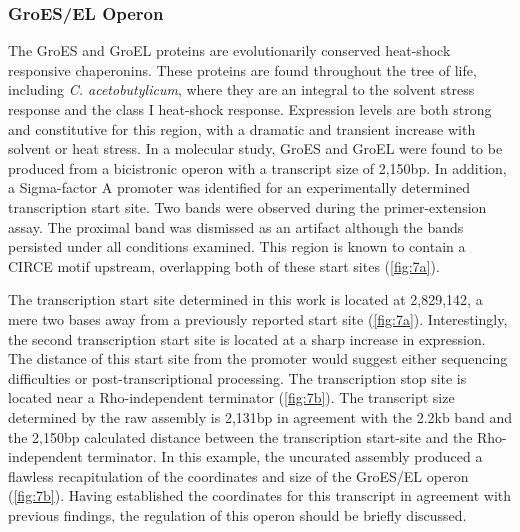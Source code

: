 \subsubsection{GroES/EL Operon}
The GroES and GroEL proteins are evolutionarily conserved heat-shock responsive chaperonins. These proteins are found throughout the tree of life, including \textit{C. acetobutylicum}, where they are an integral to the solvent stress response\cite{74,75,76} and the class I heat-shock response\cite{42,74,75}. Expression levels are both strong and constitutive for this region, with a dramatic and transient increase with solvent or heat stress\cite{74,75}. In a molecular study, GroES and GroEL were found to be produced from a bicistronic operon with a transcript size of 2,150bp\cite{76}. In addition, a Sigma-factor A promoter was identified for an experimentally determined transcription start site. Two bands were observed during the primer-extension assay\cite{76}. The proximal band was dismissed as an artifact although the bands persisted under all conditions examined\cite{76}. This region is known to contain a CIRCE motif upstream\cite{77}, overlapping both of these start sites (\ref{fig:7a})\cite{75}. 

The transcription start site determined in this work is located at 2,829,142, a mere two bases away from a previously reported start site\cite{76} (\ref{fig:7a}). Interestingly, the second transcription start site is located at a sharp increase in expression. The distance of this start site from the promoter would suggest either sequencing difficulties or post-transcriptional processing. The transcription stop site is located near a Rho-independent terminator (\ref{fig:7b}). The transcript size determined by the raw assembly is 2,131bp in agreement with the 2.2kb band and the 2,150bp calculated distance between the transcription start-site and the Rho-independent terminator\cite{77}. In this example, the uncurated assembly produced a flawless recapitulation of the coordinates and size of the GroES/EL operon (\ref{fig:7b}). Having established the coordinates for this transcript in agreement with previous findings, the regulation of this operon should be briefly discussed.

